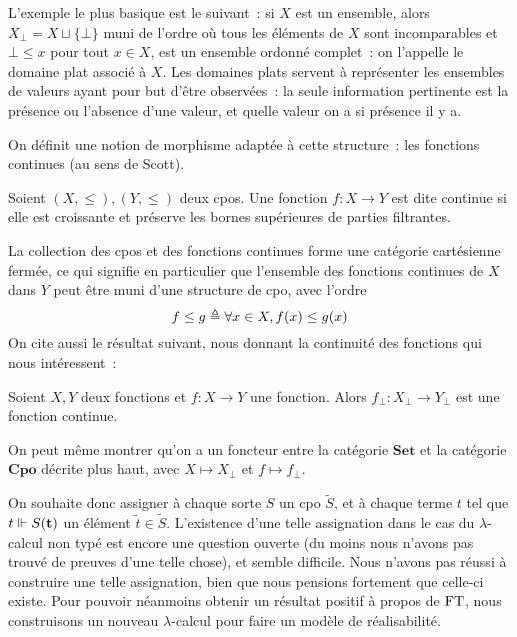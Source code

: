\documentclass{article}
\begin{document}
\begin{expl}
    L'exemple le plus basique est le suivant~: si $X$ est un ensemble, alors $X_\bot = X \sqcup \{\bot\}$ muni de l'ordre où tous les éléments de $X$ sont incomparables et $\bot \leq x$ pour tout $x \in X$, est un ensemble ordonné complet~: on l'appelle le domaine plat associé à $X$. Les domaines plats servent à représenter les ensembles de valeurs ayant pour but d'être observées~: la seule information pertinente est la présence ou l'absence d'une valeur, et quelle valeur on a si présence il y a.
\end{expl}

On définit une notion de morphisme adaptée à cette structure~: les fonctions continues (au sens de Scott).

\begin{defi}
    Soient $(X,\leq), (Y,\leq)$ deux cpos. Une fonction $f : X \to Y$ est dite continue si elle est croissante et préserve les bornes supérieures de parties filtrantes.
\end{defi}

La collection des cpos et des fonctions continues forme une catégorie cartésienne fermée, ce qui signifie en particulier que l'ensemble des fonctions continues de $X$ dans $Y$ peut être muni d'une structure de cpo, avec l'ordre
\[f\leq g \triangleq \forall x \in X, f(x) \leq g(x)\]
On cite aussi le résultat suivant, nous donnant la continuité des fonctions qui nous intéressent~:
\begin{prop}
    Soient $X,Y$ deux fonctions et $f : X \to Y$ une fonction. Alors $f_\bot : X_\bot \to Y_\bot$ est une fonction continue.
\end{prop}

On peut même montrer qu'on a un foncteur entre la catégorie $\mathbf{Set}$ et la catégorie $\mathbf{Cpo}$ décrite plus haut, avec $X \mapsto X_\bot$ et $f \mapsto f_\bot$.

On souhaite donc assigner à chaque sorte $S$ un cpo $\tilde S$, et à chaque terme $t$ tel que $t\Vdash S(\mathbf{t})$ un élément $\tilde t \in \tilde S$. L'existence d'une telle assignation dans le cas du $\lambda$-calcul non typé est encore une question ouverte (du moins nous n'avons pas trouvé de preuves d'une telle chose), et semble difficile. Nous n'avons pas réussi à construire une telle assignation, bien que nous pensions fortement que celle-ci existe. Pour pouvoir néanmoins obtenir un résultat positif à propos de $\mathrm{FT}$, nous construisons un nouveau $\lambda$-calcul pour faire un modèle de réalisabilité.
\end{document}
